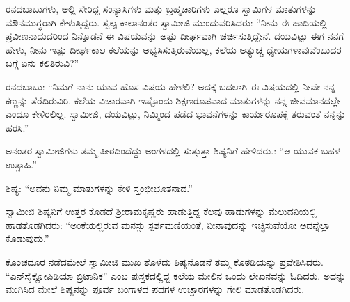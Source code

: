  ರನದಬಾಬುಗಳು, ಅಲ್ಲಿ ಸೇರಿದ್ದ ಸಂನ್ಯಾಸಿಗಳು ಮತ್ತು ಬ್ರಹ್ಮಚಾರಿಗಳು ಎಲ್ಲರೂ ಸ್ವಾಮಿಗಳ ಮಾತುಗಳನ್ನು ಮೌನಮುಗ್ಧರಾಗಿ ಕೇಳುತ್ತಿದ್ದರು. ಸ್ವಲ್ಪ ಕಾಲಾನಂತರ ಸ್ವಾಮೀಜಿ ಮುಂದುವರಿಸಿದರು: “ನೀನು ಈ ಹಾದಿಯಲ್ಲಿ ಪ್ರವೀಣನಾದುದರಿಂದ ನಿನ್ನೊಡನೆ ಈ ವಿಷಯವನ್ನು ಅಷ್ಟು ದೀರ್ಘವಾಗಿ ಚರ್ಚಿಸುತ್ತಿದ್ದೇನೆ. ದಯವಿಟ್ಟು ಈಗ ನನಗೆ ಹೇಳು, ನೀನು ಇಷ್ಟು ದೀರ್ಘಕಾಲ ಕಲೆಯನ್ನು ಅಭ್ಯಸಿಸುತ್ತಿರುವೆಯಲ್ಲ, ಕಲೆಯ ಅತ್ಯುಚ್ಚ ಧ್ಯೇಯಗಳಾವುವೆಂಬುದರ ಬಗ್ಗೆ ಏನು ಕಲಿತಿರುವಿ?” 

 ರನದಬಾಬು: “ನಿಮಗೆ ನಾನು ಯಾವ ಹೊಸ ವಿಷಯ ಹೇಳಲಿ? ಅದಕ್ಕೆ ಬದಲಾಗಿ ಈ ವಿಷಯದಲ್ಲಿ ನೀವೇ ನನ್ನ ಕಣ್ಣನ್ನು ತೆರೆದಿರುವಿರಿ. ಕಲೆಯ ವಿಚಾರವಾಗಿ ಇಷ್ಟೊಂದು ಶಿಕ್ಷಣರೂಪವಾದ ಮಾತುಗಳನ್ನು ನನ್ನ ಜೀವಮಾನದಲ್ಲೇ ಎಂದೂ ಕೇಳಿರಲಿಲ್ಲ. ಸ್ವಾಮೀಜಿ, ದಯವಿಟ್ಟು, ನಿಮ್ಮಿಂದ ಪಡೆದ ಭಾವನೆಗಳನ್ನು ಕಾರ್ಯರೂಪಕ್ಕೆ ತರುವಂತೆ ನನ್ನನ್ನು ಹರಸಿ.” 

 ಅನಂತರ ಸ್ವಾಮೀಜಿಗಳು ತಮ್ಮ ಪೀಠದಿಂದೆದ್ದು ಅಂಗಳದಲ್ಲಿ ಸುತ್ತುತ್ತಾ ಶಿಷ್ಯನಿಗೆ ಹೇಳಿದರು.: “ಆ ಯುವಕ ಬಹಳ ಉತ್ಸಾಹಿ.” 

 ಶಿಷ್ಯ: “ಅವನು ನಿಮ್ಮ ಮಾತುಗಳನ್ನು ಕೇಳಿ ಸ್ತಂಭೀಭೂತನಾದ.” 

 ಸ್ವಾಮೀಜಿ ಶಿಷ್ಯನಿಗೆ ಉತ್ತರ ಕೊಡದೆ ಶ‍್ರೀರಾಮಕೃಷ್ಣರು ಹಾಡುತ್ತಿದ್ದ ಕೆಲವು ಹಾಡುಗಳನ್ನು ಮೆಲುದನಿಯಲ್ಲಿ ಹಾಡತೊಡಗಿದರು: “ಅಂಕೆಯಲ್ಲಿರುವ ಮನಸ್ಸು ಸ್ಪರ್ಶಮಣಿಯಂತೆ, ನೀನಾವುದನ್ನು ಇಚ್ಛಿಸುವೆಯೋ ಅದನ್ನೆಲ್ಲಾ ಕೊಡುವುದು.” 

 ಕೊಂಚದೂರ ನಡೆದಮೇಲೆ ಸ್ವಾಮೀಜಿ ಮುಖ ತೊಳೆದು ಶಿಷ್ಯನೊಡನೆ ತಮ್ಮ ಕೊಠಡಿಯನ್ನು ಪ್ರವೇಶಿಸಿದರು. “ಎನ್‍ಸೈಕ್ಲೋಪಿಡಿಯಾ ಬ್ರಿಟಾನಿಕ” ಎಂಬ ಪುಸ್ತಕದಲ್ಲಿದ್ದ ಕಲೆಯ ಮೇಲಿನ ಒಂದು ಲೇಖನವನ್ನು ಓದಿದರು. ಅದನ್ನು ಮುಗಿಸಿದ ಮೇಲೆ ಶಿಷ್ಯನನ್ನು ಪೂರ್ವ ಬಂಗಾಳದ ಪದಗಳ ಉಚ್ಚಾರಗಳನ್ನು ಗೇಲಿ ಮಾಡತೊಡಗಿದರು. 

